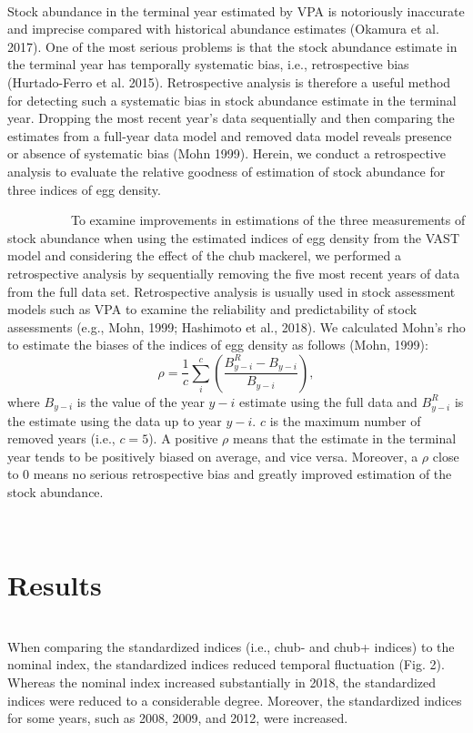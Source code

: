 \documentclass[12pt]{article}
\begin{document}
\begin{linenumbers}
{\\
Stock abundance in the terminal year estimated by VPA is notoriously inaccurate and imprecise compared with historical abundance estimates (Okamura et al. 2017). One of the most serious problems is that the stock abundance estimate in the terminal year has temporally systematic bias, i.e., retrospective bias (Hurtado-Ferro et al. 2015). Retrospective analysis is therefore a useful method for detecting such a systematic bias in stock abundance estimate in the terminal year. Dropping the most recent year's data sequentially and then comparing the estimates from a full-year data model and removed data model reveals presence or absence of systematic bias (Mohn 1999). Herein, we conduct a retrospective analysis to evaluate the relative goodness of estimation of stock abundance for} three indices of egg density.

\ \ \ \ \ \ \ \ \ \ 
To examine improvements in estimations of the three measurements of stock abundance when using the estimated indices of egg density from the VAST model and considering the effect of the chub mackerel, we performed a retrospective analysis by sequentially removing the five most recent years of data from the full data set. Retrospective analysis is usually used in stock assessment models such as VPA to examine the reliability and predictability of stock assessments (e.g., Mohn, 1999; Hashimoto et al., 2018). We calculated Mohn's rho to estimate the biases of the indices of egg density as follows (Mohn, 1999):
\[\rho = \frac{1}{c} \sum_{i}^{c} \left(\frac{B_{y-i}^R - B_{y-i}} {B_{y-i}} \right)
,\]
where $B_{y-i}$ is the value of the year $y-i$ estimate using the full data and $B_{y-i}^R$ is the estimate using the data up to year $y-i$. $c$ is the maximum number of removed years (i.e., $c = 5$). A positive $\rho$ means that the estimate in the terminal year tends to be positively biased on average, and vice versa. Moreover, a $\rho$ close to $0$ means no serious retrospective bias and greatly improved estimation of the stock abundance.

\ \\
\section{Results}
\\
When comparing the standardized indices (i.e., chub- and chub+ indices) to the nominal index, the standardized indices reduced temporal fluctuation (Fig. 2). Whereas the nominal index increased substantially in 2018, the standardized indices were reduced to a considerable degree. Moreover, the standardized indices for some years, such as 2008, 2009, and 2012, were increased.


\end{linenumbers}
\end{document}

